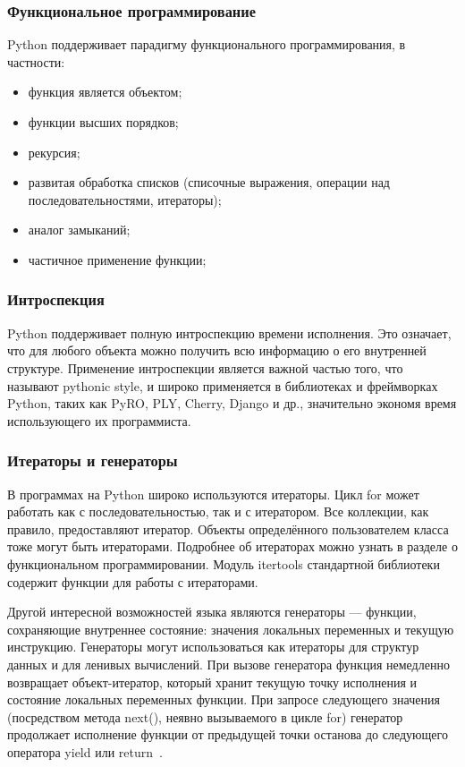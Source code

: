 \subsubsection{Функциональное программирование}
Python поддерживает парадигму функционального программирования, в частности:
\begin{itemize}
\item функция является объектом;
\item функции высших порядков;
\item рекурсия;
\item развитая обработка списков (списочные выражения, операции над последовательностями, итераторы);
\item аналог замыканий;
\item частичное применение функции;
\end{itemize}

\subsubsection{Интроспекция}
Python поддерживает полную интроспекцию времени исполнения. Это означает, что для любого объекта можно получить всю информацию о его внутренней структуре.
Применение интроспекции является важной частью того, что называют pythonic style, и широко применяется в библиотеках и фреймворках Python, таких как PyRO, PLY, Cherry, Django и др., значительно экономя время использующего их программиста.

\subsubsection{Итераторы и генераторы}
В программах на Python широко используются итераторы. Цикл for может работать как с последовательностью, так и с итератором. Все коллекции, как правило, предоставляют итератор. Объекты определённого пользователем класса тоже могут быть итераторами. Подробнее об итераторах можно узнать в разделе о функциональном программировании. Модуль itertools стандартной библиотеки содержит функции для работы с итераторами.

Другой интересной возможностей языка являются генераторы — функции, сохраняющие внутреннее состояние: значения локальных переменных и текущую инструкцию. Генераторы могут использоваться как итераторы для структур данных и для ленивых вычислений.
При вызове генератора функция немедленно возвращает объект-итератор, который хранит текущую точку исполнения и состояние локальных переменных функции. При запросе следующего значения (посредством метода next(), неявно вызываемого в цикле for) генератор продолжает исполнение функции от предыдущей точки останова до следующего оператора yield или return~\cite{dive_into_python}.


